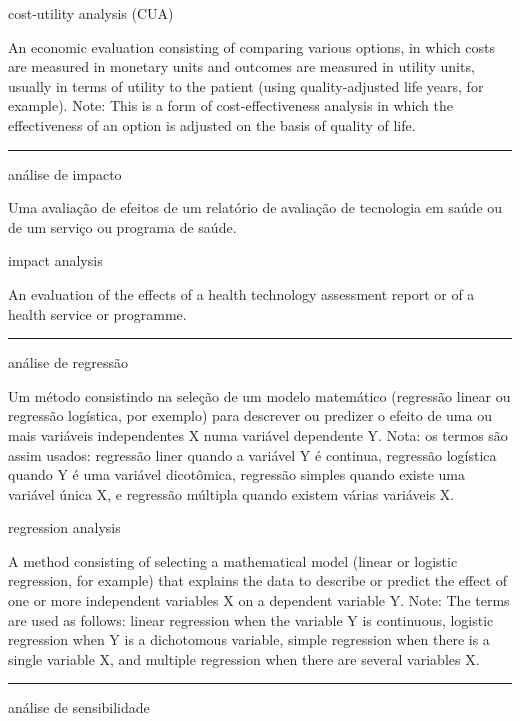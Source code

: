 \documentclass[
]{book}
\begin{document}
cost-utility analysis (CUA)

An economic evaluation consisting of comparing various options, in which costs are measured in monetary units and outcomes are measured in utility units, usually in terms of utility to the patient (using quality-adjusted life years, for example). Note: This is a form of cost-effectiveness analysis in which the effectiveness of an option is adjusted on the basis of quality of life.

\begin{center}\rule{0.5\linewidth}{0.5pt}\end{center}

análise de impacto

Uma avaliação de efeitos de um relatório de avaliação de tecnologia em saúde ou de um serviço ou programa de saúde.

impact analysis

An evaluation of the effects of a health technology assessment report or of a health service or programme.

\begin{center}\rule{0.5\linewidth}{0.5pt}\end{center}

análise de regressão

Um método consistindo na seleção de um modelo matemático (regressão linear ou regressão logística, por exemplo) para descrever ou predizer o efeito de uma ou mais variáveis independentes X numa variável dependente Y. Nota: os termos são assim usados: regressão liner quando a variável Y é continua, regressão logística quando Y é uma variável dicotômica, regressão simples quando existe uma variável única X, e regressão múltipla quando existem várias variáveis X.

regression analysis

A method consisting of selecting a mathematical model (linear or logistic regression, for example) that explains the data to describe or predict the effect of one or more independent variables X on a dependent variable Y. Note: The terms are used as follows: linear regression when the variable Y is continuous, logistic regression when Y is a dichotomous variable, simple regression when there is a single variable X, and multiple regression when there are several variables X.

\begin{center}\rule{0.5\linewidth}{0.5pt}\end{center}

análise de sensibilidade
\end{document}
